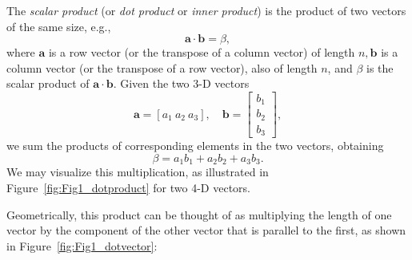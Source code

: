 The \emph{scalar product} (or \emph{dot product} or 
\emph{inner product}) is the product of two vectors of the same size, e.g.,
\begin{equation}
\mathbf{a}\cdot \mathbf{b} = \beta,
\end{equation}	 
where $\mathbf a$ is a row vector (or the transpose of a column vector) of length $n, \mathbf{b}$ is a column vector (or 
the transpose of a row vector), also of length $n$, and $\beta$ is the scalar product of $\mathbf a \cdot \mathbf b$.
Given the two 3-D vectors
\begin{equation}
\mathbf{a} = [a_1 \ a_2 \ a_3 ], \quad \mathbf{b} = \left[ \begin{array}{c}
b_1\\
b_2\\
b_3
\end{array}
\right],
\end{equation}	 
we sum the products of corresponding elements in the two vectors, obtaining
\begin{equation}
\beta = a_1 b_1 + a_2b_2 + a_3b_3.
\end{equation}
We may visualize this multiplication, as illustrated in Figure~\ref{fig:Fig1_dotproduct} for two 4-D vectors.

Geometrically, this product can be thought of as multiplying the length of one vector by the 
component of the other vector that is parallel to the first, as shown in Figure~\ref{fig:Fig1_dotvector}:


